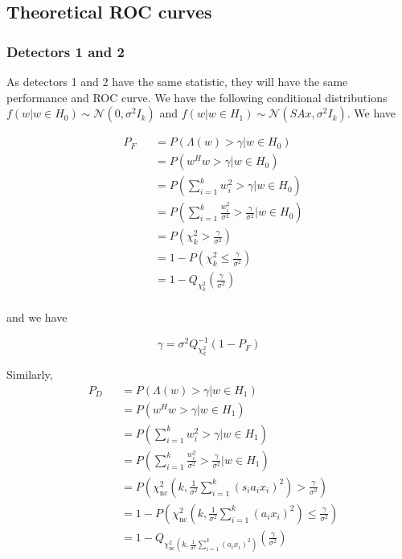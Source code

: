 \documentclass[english]{article}
\begin{document}
\subsection{Theoretical ROC curves}

\subsubsection{Detectors 1 and 2}

As detectors 1 and 2 have the same statistic, they will have the same performance and ROC curve. We have the following conditional distributions $f(w|w\in H_0)\sim\mathcal{N}(0,\sigma^2I_k)$ and $f(w|w\in H_1)\sim\mathcal{N}(SAx,\sigma^2I_k)$. We have

\begin{equation}
\begin{aligned}
&P_F
&&= P\left(\Lambda(w)>\gamma|w\in H_0\right)\\
&&&= P\left(w^Hw>\gamma|w\in H_0\right)\\
&&&= P\left(\sum_{i=1}^kw_i^2>\gamma|w\in H_0\right)\\
&&&= P\left(\sum_{i=1}^k\frac{w_i^2}{\sigma^2} > \frac{\gamma}{\sigma^2} | w\in H_0\right)\\
&&&= P\left(\chi_k^2>\frac{\gamma}{\sigma^2}\right)\\
&&&= 1- P\left(\chi_k^2 \leq \frac{\gamma}{\sigma^2}\right)\\
&&&=1-Q_{\chi_k^2}\left(\frac{\gamma}{\sigma^2}\right)\\
\end{aligned}
\end{equation}

and we have

\begin{equation}
\gamma = \sigma^2Q^{-1}_{\chi^2_k}\left(1-P_F\right)
\end{equation}

Similarly,
\begin{equation}
\begin{aligned}
&P_D
&&= P\left(\Lambda(w)>\gamma|w\in H_1\right)\\
&&&= P\left(w^Hw>\gamma|w\in H_1\right)\\
&&&= P\left(\sum_{i=1}^kw_i^2>\gamma|w\in H_1\right)\\
&&&= P\left(\sum_{i=1}^k\frac{w_i^2}{\sigma^2} > \frac{\gamma}{\sigma^2} | w\in H_1\right)\\
&&&= P\left(\chi_{\text{nc}}^2\left(k, \frac{1}{\sigma^2}\sum_{i=1}^k\left(s_ia_ix_i\right)^2\right)>\frac{\gamma}{\sigma^2}\right)\\
&&&= 1- P\left(\chi_{\text{nc}}^2\left(k, \frac{1}{\sigma^2}\sum_{i=1}^k\left(a_ix_i\right)^2\right) \leq \frac{\gamma}{\sigma^2}\right)\\
&&&=1-Q_{\chi_{\text{nc}}^2\left(k, \frac{1}{\sigma^2}\sum_{i=1}^k\left(a_ix_i\right)^2\right)}\left(\frac{\gamma}{\sigma^2}\right)\\
\end{aligned}
\end{equation}
\end{document}
